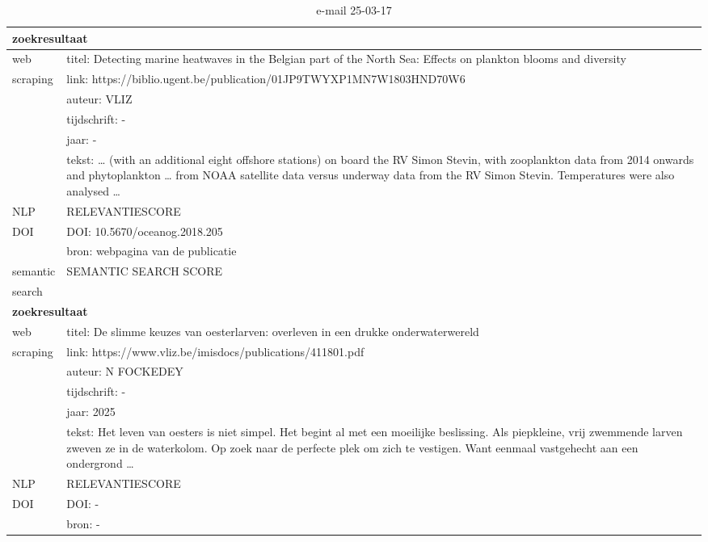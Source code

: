 \begin{table}[h!]
    \caption{e-mail 25-03-17}
    \centering
    \begin{tabularx}{\textwidth}{|p{4cm}|X|} 
        \hline
        \multicolumn{2}{|X|}{\textbf{zoekresultaat}} \\
        \hline
        web &titel: Detecting marine heatwaves in the Belgian part of the North Sea: Effects on plankton blooms and diversity\\
        scraping&link: https://biblio.ugent.be/publication/01JP9TWYXP1MN7W1803HND70W6\\
        &auteur: VLIZ\\
        &tijdschrift: -\\
        &jaar: -\\
        &tekst: … (with an additional eight offshore stations) on board the RV Simon Stevin, with zooplankton data from 2014 onwards and phytoplankton … from NOAA satellite data versus underway data from the RV Simon Stevin. Temperatures were also analysed …\\
        \hline
        NLP&RELEVANTIESCORE\\
        \hline
        DOI&DOI: 10.5670/oceanog.2018.205\\
        &bron: webpagina van de publicatie\\
        \hline
        semantic&SEMANTIC SEARCH SCORE\\
        search&\\
        \hline
        \multicolumn{2}{|X|}{\textbf{zoekresultaat}} \\
        \hline
        web &titel: De slimme keuzes van oesterlarven: overleven in een drukke onderwaterwereld\\
        scraping&link: https://www.vliz.be/imisdocs/publications/411801.pdf\\
        &auteur: N FOCKEDEY\\
        &tijdschrift: -\\
        &jaar: 2025\\
        &tekst: Het leven van oesters is niet simpel. Het begint al met een moeilijke beslissing. Als piepkleine, vrij zwemmende larven zweven ze in de waterkolom. Op zoek naar de perfecte plek om zich te vestigen. Want eenmaal vastgehecht aan een ondergrond …\\
        \hline
        NLP&RELEVANTIESCORE\\
        \hline
        DOI&DOI: -\\
        &bron: -\\

\end{tabularx}
\end{table}

